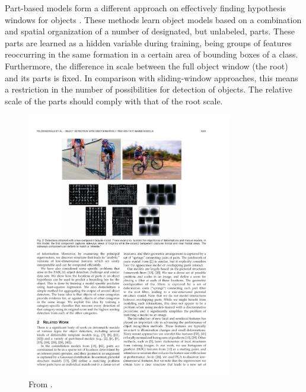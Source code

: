 Part-based models form a different approach on effectively finding hypothesis windows for objects \cite{felzenszwalb2010object}. These methods learn object models based on a combination and spatial organization of a number of designated, but unlabeled, parts. These parts are learned as a hidden variable during training, being groups of features reoccurring in the same formation in a certain area of bounding boxes of a class. Furthermore, the difference in scale between the full object window (the root) and its parts is fixed. In comparison with sliding-window approaches, this means a restriction in the number of possibilities for detection of objects. The relative scale of the parts should comply with that of the root scale.


\begin{figure}[hbt]
    \centering
    \includegraphics[width=0.8\textwidth]{PartBasedDet}
    \caption{From \cite{felzenszwalb2010object}.}
    \label{fig:partbaseddet}
\end{figure}

